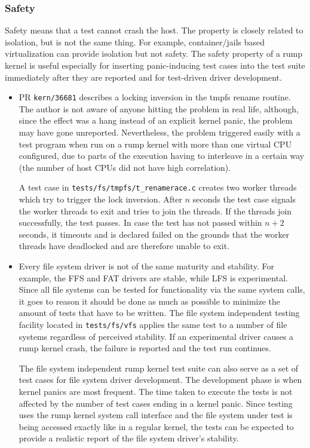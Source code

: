 \subsubsection*{Safety}

Safety means that a test cannot crash the host.  The property is
closely related to isolation, but is not the same thing.  For
example, container/jails based virtualization can provide isolation
but not safety.  The safety property of a rump kernel is useful
especially for inserting panic-inducing test cases into
the test suite immediately after they are reported and for test-driven
driver development.

\begin{itemize}
\item   PR \texttt{kern/36681} describes a locking inversion in
	the tmpfs rename routine.  The author is not aware of anyone
	hitting the problem in real life, although, since the effect
	was a hang instead of an explicit kernel panic, the problem
	may have gone unreported.  Nevertheless, the problem
	triggered easily with a test program when run on a rump
	kernel with more than one virtual CPU configured, due to
	parts of the execution having to interleave in a certain
	way (the number of host CPUs did not have high correlation).

	A test case in \verb+tests/fs/tmpfs/t_renamerace.c+ creates
	two worker threads which try to trigger the lock inversion.
	After $n$ seconds the test case signals the worker threads
	to exit and tries to join the threads.  If the threads join
	successfully, the test passes.  In case the test has not
	passed within $n+2$ seconds, it timeouts and is declared
	failed on the grounds that the worker threads have deadlocked
	and are therefore unable to exit.

\item   Every file system driver is not of the same maturity and
	stability.  For example, the FFS and FAT drivers
	are stable, while LFS is experimental.  Since all file
	systems can be tested for functionality via the same system
	calls, it goes to reason it should be done as much as
	possible to minimize the amount of tests that have to be
	written.  The file system independent testing facility
	located in \texttt{tests/fs/vfs}
	applies the same test to a number of file systems regardless
	of perceived stability.  If an experimental
	driver causes a rump kernel crash, the failure is reported and
	the test run continues.

	The file system independent rump kernel test suite can also
	serve as a set of test cases for file system driver
	development.  The development phase is when kernel panics are most frequent.
	The time taken to execute the tests is not affected by the
	number of test cases ending in a kernel panic.  Since
	testing uses the rump kernel system call interface and the
	file system under test is being accessed exactly like
	in a regular kernel, the tests can be expected to provide
	a realistic report of the file system driver's stability.
\end{itemize}


